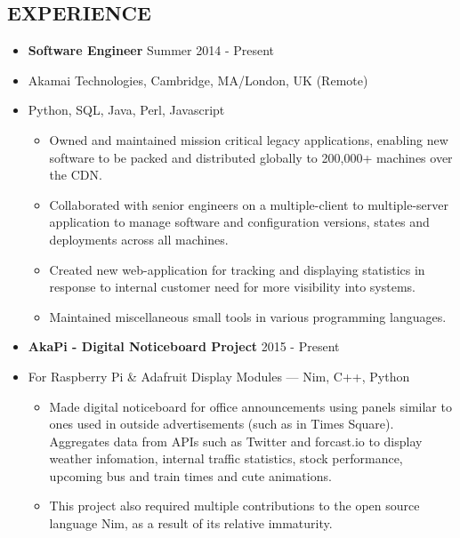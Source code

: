 \documentclass[line,margin]{res}
\newcommand\oindent{0em}
\newcommand\lindent{1.5em}
\newcommand\spacing{0.6em}
\newcommand\si{\item[]}
\newenvironment{secretlist}[1]{\begin{itemize}[noitemsep,leftmargin=#1,nolistsep]}{\end{itemize}}
\begin{document}
    \address{\addr}
    \address{\email / \phone}

    \begin{resume}
        \section{EXPERIENCE}
            \begin{secretlist}{\oindent}
                \si \textbf{Software Engineer} \hfill Summer 2014 - Present
                \si Akamai Technologies, Cambridge, MA/London, UK (Remote)
                \si Python, SQL, Java, Perl, Javascript
                \begin{secretlist}{\lindent}
                    \si Owned and maintained mission critical legacy applications, enabling new software to be packed and distributed globally to 200,000+ machines over the CDN.
                    \si Collaborated with senior engineers on a multiple-client to multiple-server application to manage software and configuration versions, states and deployments across all machines.
                    \si Created new web-application for tracking and displaying statistics in response to internal customer need for more visibility into systems.
                    \si Maintained miscellaneous small tools in various programming languages.
                \end{secretlist}
            \end{secretlist}
            \vspace{\spacing}
            \begin{secretlist}{\oindent}
                \si \textbf{AkaPi - Digital Noticeboard Project} \hfill 2015 - Present
                \si For Raspberry Pi \& Adafruit Display Modules --- Nim, C++, Python
                \begin{secretlist}{\lindent}
                    \si Made digital noticeboard for office announcements using panels similar to ones used in outside advertisements (such as in Times Square). Aggregates data from APIs such as Twitter and forcast.io to display weather infomation, internal traffic statistics, stock performance, upcoming bus and train times and cute animations.
                    \si This project also required multiple contributions to the open source language Nim, as a result of its relative immaturity.
                \end{secretlist}
            \end{secretlist}

\end{resume}
\end{document}
